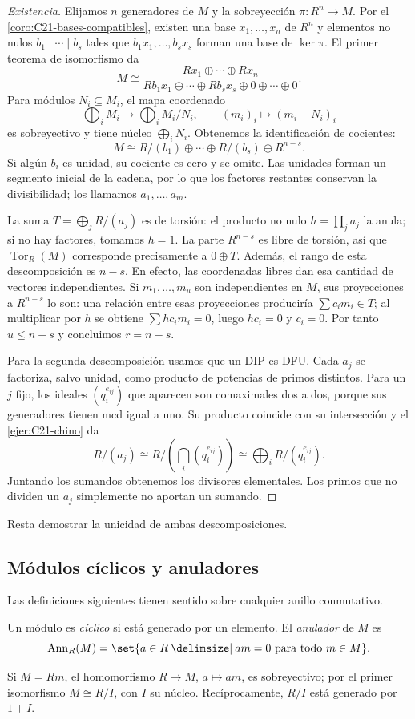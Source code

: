 \begin{proof}[Existencia]
Elijamos $n$ generadores de $M$ y la sobreyección $\pi:R^n\to M$. Por el \cref{coro:C21-bases-compatibles}, existen una base $x_1,\ldots,x_n$ de $R^n$ y elementos no nulos $b_1\mid\cdots\mid b_s$ tales que $b_1x_1,\ldots,b_sx_s$ forman una base de $\ker\pi$. El primer teorema de isomorfismo da
\[
M\cong\frac{Rx_1\oplus\cdots\oplus Rx_n}
 {Rb_1x_1\oplus\cdots\oplus Rb_sx_s\oplus0\oplus\cdots\oplus0}.
\]
Para módulos $N_i\subseteq M_i$, el mapa coordenado
\[
\bigoplus_i M_i\longrightarrow\bigoplus_i M_i/N_i,
\qquad (m_i)_i\longmapsto(m_i+N_i)_i
\]
es sobreyectivo y tiene núcleo $\bigoplus_i N_i$. Obtenemos la identificación de cocientes:
\[
M\cong R/(b_1)\oplus\cdots\oplus R/(b_s)\oplus R^{n-s}.
\]
Si algún $b_i$ es unidad, su cociente es cero y se omite. Las unidades forman un segmento inicial de la cadena, por lo que los factores restantes conservan la divisibilidad; los llamamos $a_1,\ldots,a_m$.

La suma $T=\bigoplus_jR/(a_j)$ es de torsión: el producto no nulo $h=\prod_j a_j$ la anula; si no hay factores, tomamos $h=1$. La parte $R^{n-s}$ es libre de torsión, así que $\operatorname{Tor}_R(M)$ corresponde precisamente a $0\oplus T$. Además, el rango de esta descomposición es $n-s$. En efecto, las coordenadas libres dan esa cantidad de vectores independientes. Si $m_1,\ldots,m_u$ son independientes en $M$, sus proyecciones a $R^{n-s}$ lo son: una relación entre esas proyecciones produciría $\sum c_im_i\in T$; al multiplicar por $h$ se obtiene $\sum hc_im_i=0$, luego $hc_i=0$ y $c_i=0$. Por tanto $u\leq n-s$ y concluimos $r=n-s$.

Para la segunda descomposición usamos que un DIP es DFU. Cada $a_j$ se factoriza, salvo unidad, como producto de potencias de primos distintos. Para un $j$ fijo, los ideales $(q_i^{e_{ij}})$ que aparecen son comaximales dos a dos, porque sus generadores tienen mcd igual a uno. Su producto coincide con su intersección y el \cref{ejer:C21-chino} da
\[
R/(a_j)\cong
R/\!\left(\bigcap_i(q_i^{e_{ij}})\right)
\cong\bigoplus_iR/(q_i^{e_{ij}}).
\]
Juntando los sumandos obtenemos los divisores elementales. Los primos que no dividen un $a_j$ simplemente no aportan un sumando.
\end{proof}
Resta demostrar la unicidad de ambas descomposiciones.

\subsection{Módulos cíclicos y anuladores}\label{tema:21-3-1}
Las definiciones siguientes tienen sentido sobre cualquier anillo conmutativo.
\begin{defi}
Un módulo es \emph{cíclico} si está generado por un elemento. El \emph{anulador} de $M$ es
\[
\operatorname{Ann}_R(M)
=\set{a\in R\given am=0\text{ para todo }m\in M}.
\]
\end{defi}
Si $M=Rm$, el homomorfismo $R\to M$, $a\mapsto am$, es sobreyectivo; por el primer isomorfismo $M\cong R/I$, con $I$ su núcleo. Recíprocamente, $R/I$ está generado por $1+I$.

